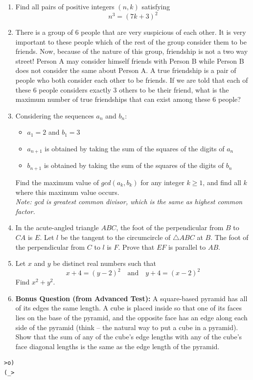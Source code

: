 \documentclass{article}
\begin{document}
\begin{enumerate}[1.]
\item %
Find all pairs of positive integers $(n,k)$ satisfying $$n^3=(7k+3)^2$$


\item %
There is a group of 6 people that are very suspicious of each other. It is very important to these people which of the rest of the group consider them to be friends. Now, because of the nature of this group, friendship is not a two way street! Person A may consider himself friends with Person B while Person B does not consider the same about Person A. A true friendship is a pair of people who both consider each other to be friends. If we are told that each of these 6 people considers exactly 3 others to be their friend, what is the maximum number of true friendships that can exist among these 6 people?


\item %
Considering the sequences $a_n$ and $b_n$:
\begin{itemize}
\item $a_1=2$ and $b_1=3$
\item $a_{n+1}$ is obtained by taking the sum of the squares of the digits of $a_{n}$
\item $b_{n+1}$ is obtained by taking the sum of the squares of the digits of $b_n$
\end{itemize}
Find the maximum value of $gcd(a_k,b_k)$ for any integer $k\geq 1$, and find all $k$ where this maximum value occurs.\\
\textit{Note: gcd is greatest common divisor, which is the same as highest common factor.}


\item %
In the acute-angled triangle $ABC$, the foot of the perpendicular from $B$ to $CA$ is $E$. Let $l$ be the tangent to the circumcircle of $\triangle ABC$ at $B$. The foot of the perpendicular from $C$ to $l$ is $F$. Prove that $EF$ is parallel to $AB$.


\item %
Let $x$ and $y$ be distinct real numbers such that $$x + 4 = (y - 2)^2 \quad\text{and}\quad y + 4 = (x - 2)^2$$
Find $x^2 + y^2$.

\item %
\textbf{Bonus Question (from Advanced Test):}
A square-based pyramid has all of its edges the same length.
A cube is placed inside so that one of its faces lies on the base of the pyramid, and the opposite face has an edge along each side of the pyramid (think -- the natural way to put a cube in a pyramid).
Show that the sum of any of the cube's edge lengths with any of the cube's face diagonal lengths is the same as the edge length of the pyramid.


\end{enumerate}


\vfill
\centering
\begin{BVerbatim}
>o)
(_>
\end{BVerbatim}
\end{document}
